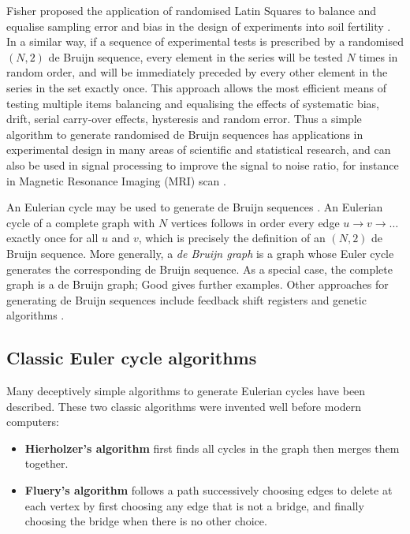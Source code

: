 \documentclass[preprint,times]{elsarticle}
\begin{document}
Fisher proposed the application of randomised Latin Squares to balance and equalise sampling error and bias in the design of experiments into soil fertility \cite{fisher}. 
In a similar way, if a sequence of experimental tests is prescribed by a randomised $(N,2)$ de Bruijn sequence, every element in the series will be tested $N$ times in random order, and will be immediately preceded by every other element in the series in the set exactly once. This approach allows the most efficient means of testing multiple items balancing and equalising the effects of systematic bias, drift, serial carry-over effects, hysteresis and random error. Thus a simple algorithm to generate randomised de Bruijn sequences has applications in experimental design in many areas of scientific and statistical research,  and can also be used in signal processing to improve the signal to noise ratio, for instance in Magnetic Resonance Imaging (MRI) scan \cite{aguirre}.

An Eulerian cycle may be used to generate de Bruijn sequences \cite{fleury,hierholzer}. An Eulerian cycle of a complete graph with $N$ vertices follows in order every edge $u \rightarrow v \rightarrow\ldots$ exactly once for all $u$ and $v$, which is precisely the definition of an $(N,2)$ de Bruijn sequence. More generally, a \emph{de Bruijn graph\/} is a graph whose Euler cycle generates the corresponding de Bruijn sequence. As a special case, the complete graph is a de Bruijn graph; Good \cite{good} gives further examples. Other approaches for generating de Bruijn sequences include feedback shift registers and genetic algorithms \cite{turan,knuth4a}.%

\subsection{Classic Euler cycle algorithms}\label{new-algorithm}
Many deceptively simple algorithms to generate Eulerian cycles have been described. These two classic algorithms were invented well before modern computers:

\begin{itemize}\raggedright
\item \textbf{Hierholzer's algorithm} \cite{hierholzer} first finds all cycles in the graph then merges them together. 
\item \textbf{Fluery's algorithm} \cite{fleury} follows a path successively choosing edges to delete at each vertex by first choosing any edge that is not a bridge, and finally choosing the bridge when there is no other choice.
\end{itemize}
\end{document}
